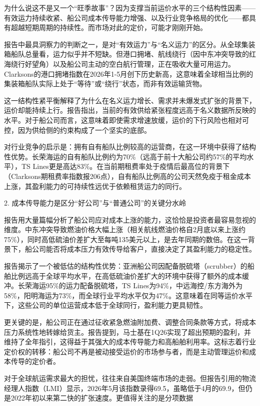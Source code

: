 \documentclass[11pt]{ctexart}
\begin{document}
为什么说这不是又一个“旺季故事”？因为支撑当前运价水平的三个结构性因素——有效运力持续收紧、船公司成本传导能力增强、以及行业竞争格局的优化——都具有超越短期周期的持续性。而市场对此的定价，可能才刚刚开始。

报告中最具洞察力的判断之一，是对“有效运力”与“名义运力”的区分。从全球集装箱船队总量看，运力似乎并不短缺。但港口拥堵、航线绕行（因中东冲突导致的红海绕行好望角）以及船公司主动的空白航行管理，正在吸收大量可用运力。Clarksons的港口拥堵指数在2026年1-5月创下历史新高，这意味着全球相当比例的集装箱船队实际上处于“等待”或“绕行”状态，而非有效运输货物。

这一结构性紧平衡解释了为什么在名义运力增长、需求并未爆发式扩张的背景下，运价却能持续上行。报告指出，当前的有效供给紧张程度远高于名义数据所反映的水平。对于船公司而言，这意味着即使需求增速放缓，运价的下行风险也相对可控，因为供给侧的约束构成了一个坚实的底部。

对行业竞争的启示是：拥有自有船队比例较高的运营商，在这一环境中获得了结构性优势。长荣海运的自有船队比例约为70\%（远高于前十大船公司约57\%的平均水平），TS Lines更是高达83\%。在当前期租费率处于疫情后最高位的背景下（Clarksons期租费率指数报206点），自有船队比例高的公司天然免疫于租金成本上涨，其盈利能力的可持续性远优于依赖租赁运力的同行。

2. 成本传导能力是区分“好公司”与“普通公司”的关键分水岭

报告用大量篇幅分析了船公司应对成本上涨的能力，这恰恰是投资者最容易忽视的维度。中东冲突导致燃油价格大幅上涨（相关航线燃油价格自2月底以来上涨约75\%），同时高低硫油价差扩大至每吨135美元以上，是去年同期的数倍。在这一背景下，船公司能否将成本压力有效传导给客户，直接决定了其盈利能力的稳定性。

报告揭示了一个被低估的结构性优势：亚洲船公司因配备脱硫塔（scrubber）的船舶比例远高于全球平均水平，在高低硫油价差扩大的环境中获得了额外的成本缓冲。长荣海运95\%的运力配备脱硫塔，TS Lines为94\%，中远海控/东方海外为58\%，阳明海运为73\%，而全球行业平均水平仅为47\%。这意味着在同等运价水平下，这些公司的单位运营成本低于全球同行，盈利能力更具韧性。

更关键的是，船公司正在通过征收紧急燃油附加费、调整合同条款等方式，将成本压力系统性地转嫁给货主。报告提到，马士基在1Q26实现了超出预期的盈利，并维持了全年指引，这得益于其强大的成本传导能力和高船舶利用率。这标志着行业定价权的转移：船公司不再是被动接受运价的市场参与者，而是主动管理运价和成本传导的定价者。

对于全球航运需求最大的担忧，往往来自美国终端市场的走弱。但报告引用的物流经理人指数（LMI）显示，2026年5月该指数录得69.5，虽略低于4月的69.9，但仍是2022年初以来第二快的扩张速度。更值得关注的是分项数据
\end{document}
